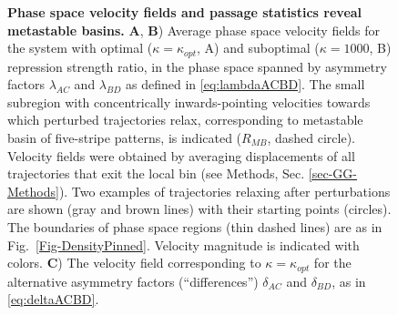 \documentclass[a4paper,10pt]{article}
\begin{document}
\begin{figure}[h!]
  \centering
  \caption{
  \textbf{Phase space velocity fields and passage statistics reveal metastable basins.}
  \textbf{A}, \textbf{B})  Average phase space velocity fields for the system with optimal ($\kappa=\kappa_{opt}$, A) and suboptimal ($\kappa=1000$, B) repression strength ratio, in the phase space spanned by asymmetry factors $\lambda_{AC}$ and $\lambda_{BD}$ as defined in \eqref{eq:lambdaACBD}. The small subregion with concentrically inwards-pointing velocities towards which perturbed trajectories relax, corresponding to metastable basin of five-stripe patterns, is indicated ($R_{MB}$, dashed circle). Velocity fields were obtained by averaging displacements of all trajectories that exit the local bin (see Methods, Sec. \ref{sec-GG-Methods}). Two examples of trajectories relaxing after perturbations are shown (gray and brown lines) with their starting points (circles). The boundaries of phase space regions (thin dashed lines) are as in Fig.~\ref{Fig-DensityPinned}. Velocity magnitude is indicated with colors. \textbf{C}) The velocity field corresponding to $\kappa=\kappa_{opt}$ for the alternative asymmetry factors (``differences'') $\delta_{AC}$ and $\delta_{BD}$, as in \eqref{eq:deltaACBD}. 
}
\end{figure}
\end{document}

